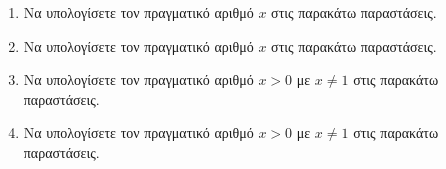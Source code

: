 \documentclass[twoside,nofonts,internet]{askhseis}
\begin{document}
\begin{enumerate}
\begin{multicols}{2}
\end{multicols}
\item Να υπολογίσετε τον πραγματικό αριθμό $ x $ στις παρακάτω παραστάσεις.
\begin{multicols}{2}
\end{multicols}
\item Να υπολογίσετε τον πραγματικό αριθμό $ x $ στις παρακάτω παραστάσεις.
\begin{multicols}{2}
\end{multicols}
\item Να υπολογίσετε τον πραγματικό αριθμό $ x>0$ με $ x\neq 1 $ στις παρακάτω παραστάσεις.
\begin{multicols}{2}
\end{multicols}
\item Να υπολογίσετε τον πραγματικό αριθμό $ x>0$ με $ x\neq 1 $ στις παρακάτω παραστάσεις.

\end{enumerate}
\end{document}
